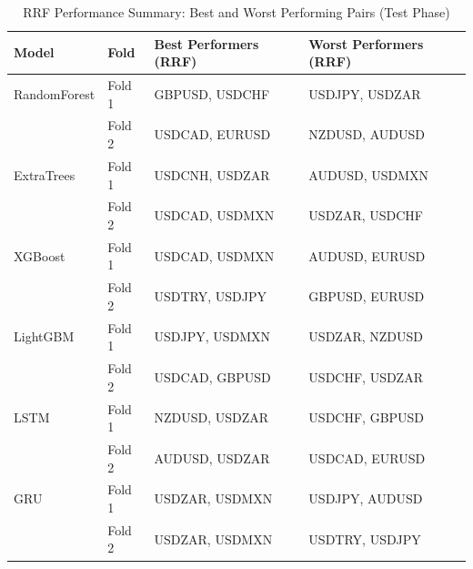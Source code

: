 \begin{table}[H]
\caption{{RRF Performance Summary: Best and Worst Performing Pairs (Test Phase)}}
\label{tab:rrf_summary_test}
\begin{tabular}{l l p{5cm} p{5cm}}
\toprule
Model & Fold & Best Performers (RRF) & Worst Performers (RRF) \\
\midrule
RandomForest & Fold 1 & GBPUSD, USDCHF & USDJPY, USDZAR \\
 & Fold 2 & USDCAD, EURUSD & NZDUSD, AUDUSD \\
ExtraTrees & Fold 1 & USDCNH, USDZAR & AUDUSD, USDMXN \\
 & Fold 2 & USDCAD, USDMXN & USDZAR, USDCHF \\
XGBoost & Fold 1 & USDCAD, USDMXN & AUDUSD, EURUSD \\
 & Fold 2 & USDTRY, USDJPY & GBPUSD, EURUSD \\
LightGBM & Fold 1 & USDJPY, USDMXN & USDZAR, NZDUSD \\
 & Fold 2 & USDCAD, GBPUSD & USDCHF, USDZAR \\
LSTM & Fold 1 & NZDUSD, USDZAR & USDCHF, GBPUSD \\
 & Fold 2 & AUDUSD, USDZAR & USDCAD, EURUSD \\
GRU & Fold 1 & USDZAR, USDMXN & USDJPY, AUDUSD \\
 & Fold 2 & USDZAR, USDMXN & USDTRY, USDJPY \\
\bottomrule
\end{tabular}
\end{table}
